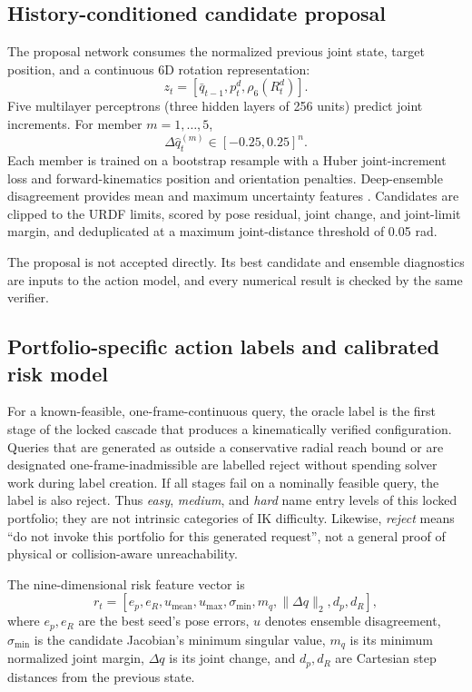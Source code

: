 \documentclass[10pt,a4paper]{article}
\begin{document}
\subsection{History-conditioned candidate proposal}

The proposal network consumes the normalized previous joint state, target position,
and a continuous 6D rotation representation:
\begin{equation}
  z_t=[\bar q_{t-1},p_t^d,\rho_6(R_t^d)].
\end{equation}
Five multilayer perceptrons (three hidden layers of 256 units) predict joint
increments. For member $m=1,\ldots,5$,
\begin{equation}
  \Delta\hat q_t^{(m)}\in[-0.25,0.25]^n.
\end{equation}
Each member is trained on a bootstrap resample with a Huber joint-increment loss and
forward-kinematics position and orientation penalties. Deep-ensemble disagreement
provides mean and maximum uncertainty features \cite{lakshminarayanan2017ensembles}.
Candidates are clipped to the URDF limits, scored by pose residual, joint change, and
joint-limit margin, and deduplicated at a maximum joint-distance threshold of 0.05 rad.

The proposal is not accepted directly. Its best candidate and ensemble diagnostics
are inputs to the action model, and every numerical result is checked by the same
verifier.

\subsection{Portfolio-specific action labels and calibrated risk model}

For a known-feasible, one-frame-continuous query, the oracle label is the first stage of
the locked cascade that produces a kinematically verified configuration. Queries that
are generated as outside a conservative radial reach bound or are designated
one-frame-inadmissible are labelled reject without spending solver work during label
creation. If all stages fail on a nominally feasible query, the label is also reject.
Thus \emph{easy}, \emph{medium}, and \emph{hard} name entry levels of this locked
portfolio; they are not intrinsic categories of IK difficulty. Likewise, \emph{reject}
means ``do not invoke this portfolio for this generated request'', not a general proof
of physical or collision-aware unreachability.

The nine-dimensional risk feature vector is
\begin{equation}
r_t=[e_p,e_R,u_{\mathrm{mean}},u_{\max},\sigma_{\min},m_q,
      \|\Delta q\|_2,d_p,d_R],
\end{equation}
where $e_p,e_R$ are the best seed's pose errors, $u$ denotes ensemble disagreement,
$\sigma_{\min}$ is the candidate Jacobian's minimum singular value, $m_q$ is its
minimum normalized joint margin, $\Delta q$ is its joint change, and $d_p,d_R$ are
Cartesian step distances from the previous state.
\end{document}
